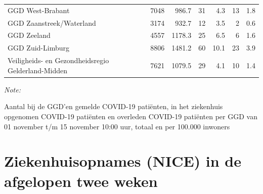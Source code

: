 \documentclass[
  english,
  man,floatsintext]{apa6}
\begin{document}
\begin{table}
\begin{threeparttable}
\begin{tabular}{lrrrrrr}
GGD West-Brabant & 7048 & 986.7 & 31 & 4.3 & 13 & 1.8\\
GGD Zaanstreek/Waterland & 3174 & 932.7 & 12 & 3.5 & 2 & 0.6\\
GGD Zeeland & 4557 & 1178.3 & 25 & 6.5 & 6 & 1.6\\
GGD Zuid-Limburg & 8806 & 1481.2 & 60 & 10.1 & 23 & 3.9\\
Veiligheids- en Gezondheidsregio Gelderland-Midden & 7621 & 1079.5 & 29 & 4.1 & 10 & 1.4\\
\bottomrule
\end{tabular}
\begin{tablenotes}
\item \textit{Note: } 
\item Aantal bij de GGD’en gemelde COVID-19 patiënten, in het ziekenhuis opgenomen COVID-19 patiënten en overleden COVID-19 patiënten per GGD van 01 november t/m 15 november 10:00 uur, totaal en per 100.000 inwoners
\end{tablenotes}
\end{threeparttable}
\endgroup{}
\end{table}

\newpage

\hypertarget{ziekenhuisopnames-nice-in-de-afgelopen-twee-weken}{%
\section{Ziekenhuisopnames (NICE) in de afgelopen twee weken}\label{ziekenhuisopnames-nice-in-de-afgelopen-twee-weken}}
\end{document}
